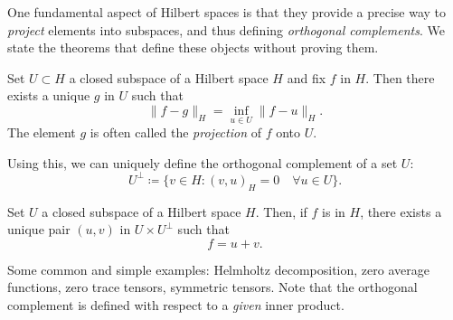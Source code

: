 One fundamental aspect of Hilbert spaces is that they provide a precise way to \emph{project} elements into subspaces, and thus defining \emph{orthogonal complements}. We state the theorems that define these objects without proving them. 
\begin{theorem}\label{thm:best-approximation}
    Set $U\subset H$ a closed subspace of a Hilbert space $H$ and fix $f$ in $H$. Then there exists a unique $g$ in $U$ such that
        \begin{equation}\label{eq:best-approximation} 
            \|f - g \|_H = \inf_{u\in U} \| f - u\|_H.
        \end{equation}
    The element $g$ is often called the \emph{projection} of $f$ onto $U$. 
\end{theorem}
Using this, we can uniquely define the orthogonal complement of a set $U$: 
\begin{equation}\label{eq:orthogonal-complement}
    U^\perp \coloneqq \{v\in H: (v, u)_H = 0 \quad\forall u\in U\}.
\end{equation}
\begin{theorem}\label{thm:orthogonal-decomposition} 
    Set $U$ a closed subspace of a Hilbert space $H$. Then, if $f$ is in $H$, there exists a unique pair $(u,v)$ in $U\times U^\perp$ such that 
    \begin{equation}\label{eq:orthogonal-decomposition} 
        f = u + v.
    \end{equation}
\end{theorem}
Some common and simple examples: Helmholtz decomposition, zero average functions, zero trace tensors, symmetric tensors. Note that the orthogonal complement is defined with respect to a \emph{given} inner product.\\

